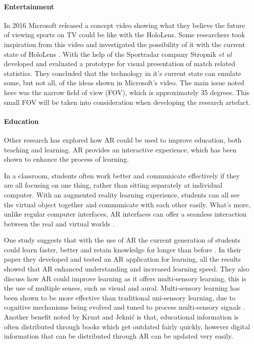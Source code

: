 \documentclass[journal]{IEEEtran}
\begin{document}
\paragraph{Entertainment}
In 2016 Microsoft released a concept video \cite{HoloLens_lookintofuture} showing what they believe the future of viewing sports on TV could be like with the HoloLens. Some researchers took inspiration from this video and investigated the possibility of it with the current state of HoloLens \cite{stropnik_look_2018}. With the help of the Sportradar company \cite{sportradar} Stropnik \textit{et al} developed and evaluated a prototype for visual presentation of match related statistics. They concluded that the technology in it's current state can emulate some, but not all, of the ideas shown in Microsoft's video. The main issue noted here was the narrow field of view (FOV), which is approximately 35 degrees. This small FOV will be taken into consideration when developing the research artefact.

\paragraph{Education}
Other research has explored how AR could be used to improve education, both teaching and learning. AR provides an interactive experience, which has been shown to enhance the process of learning.

In a classroom, students often work better and communicate effectively if they are all focusing on one thing, rather than sitting separately at individual computer. With an augmented reality learning experience, students can all see the virtual object together and communicate with each other easily. What's more, unlike regular computer interfaces, AR interfaces can offer a seamless interaction between the real and virtual worlds \cite{billinghurst_augmented_nodate}. 

One study suggests that with the use of AR the current generation of students could learn faster, better and retain knowledge for longer than before \cite{kraut_improving_2015}. In their paper they developed and tested an AR application for learning, all the results showed that AR enhanced understanding and increased learning speed. They also discuss how AR could improve learning as it offers multi-sensory learning, this is the use of multiple senses, such as visual and aural. Multi-sensory learning has been shown to be more effective than traditional uni-sensory learning, due to cognitive mechanisms being evolved and tuned to process multi-sensory signals \cite{shams_benefits_2008}. Another benefit noted by Kruat and Jeknić \cite{kraut_improving_2015} is that, educational information is often distributed through books which get outdated fairly quickly, however digital information that can be distributed through AR can be updated very easily.
\end{document}
